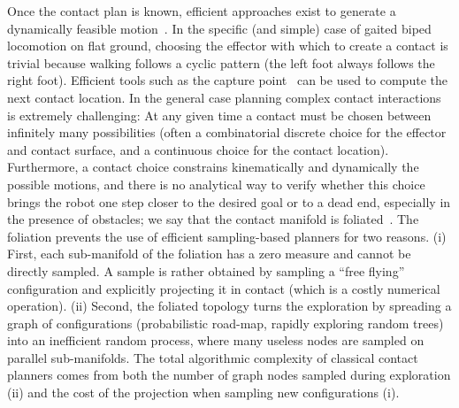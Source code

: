 \documentclass[journal]{IEEEtran}
\begin{document}
Once the contact plan is known, efficient approaches exist to generate a dynamically feasible motion~\citep{Carpentier2016}.
In the specific (and simple) case of gaited biped locomotion on flat ground, 
choosing the effector with which to create a contact is trivial because walking follows a cyclic pattern (the left foot always follows the right foot).
Efficient tools such as the capture point~\citep{Pratt2006} can be used to compute the next contact location.
In the general case planning complex contact interactions is extremely challenging:
At any given time a contact must be chosen between infinitely many possibilities (often a combinatorial discrete choice for the effector and contact surface, and a continuous choice for the contact location). Furthermore, a contact choice constrains kinematically and dynamically the possible motions, and there is no analytical way to verify whether this choice brings the robot one step closer to the desired goal or to a dead end, especially in the presence of obstacles; we say that the contact manifold is foliated~\citep{simeon-manipulation-04}. 
The
foliation prevents the use of efficient sampling-based
planners
for two reasons. (i) First, each sub-manifold of the         
foliation
has
a zero measure and cannot be directly sampled.         
A
sample
is
rather obtained by sampling a “free flying”         
configuration
and
explicitly projecting it in contact (which is a         
costly
numerical
operation).
(ii) Second, the foliated topology       
turns
the
exploration
by
spreading
a graph of configurations        
(probabilistic
road-map,
rapidly
exploring
random trees) into      
an
inefficient
random
process,
where
many
useless nodes       
are
sampled
on
parallel
sub-manifolds.
The
total
algorithmic       
complexity
of
classical
contact
planners
comes
from
both the        
number
of
graph
nodes
sampled
during
exploration
(ii) and
the cost of the projection when sampling new configurations
(i).
\end{document}

